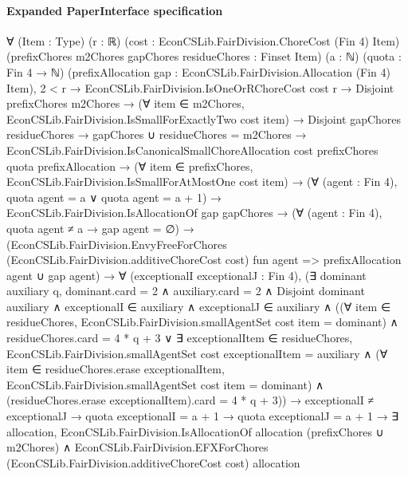 \documentclass[10pt]{article}
\begin{document}
\paragraph{Expanded PaperInterface specification}
\begin{ReviewVerbatim}
∀ (Item : Type) (r : ℝ) (cost : EconCSLib.FairDivision.ChoreCost (Fin 4) Item)
  (prefixChores m2Chores gapChores residueChores : Finset Item) (a : ℕ) (quota : Fin 4 → ℕ)
  (prefixAllocation gap : EconCSLib.FairDivision.Allocation (Fin 4) Item),
  2 < r →
    EconCSLib.FairDivision.IsOneOrRChoreCost cost r →
      Disjoint prefixChores m2Chores →
        (∀ item ∈ m2Chores, EconCSLib.FairDivision.IsSmallForExactlyTwo cost item) →
          Disjoint gapChores residueChores →
            gapChores ∪ residueChores = m2Chores →
              EconCSLib.FairDivision.IsCanonicalSmallChoreAllocation cost prefixChores quota prefixAllocation →
                (∀ item ∈ prefixChores, EconCSLib.FairDivision.IsSmallForAtMostOne cost item) →
                  (∀ (agent : Fin 4), quota agent = a ∨ quota agent = a + 1) →
                    EconCSLib.FairDivision.IsAllocationOf gap gapChores →
                      (∀ (agent : Fin 4), quota agent ≠ a → gap agent = ∅) →
                        (EconCSLib.FairDivision.EnvyFreeForChores (EconCSLib.FairDivision.additiveChoreCost cost)
                            fun agent => prefixAllocation agent ∪ gap agent) →
                          ∀ (exceptionalI exceptionalJ : Fin 4),
                            (∃ dominant auxiliary q,
                                dominant.card = 2 ∧
                                  auxiliary.card = 2 ∧
                                    Disjoint dominant auxiliary ∧
                                      exceptionalI ∈ auxiliary ∧
                                        exceptionalJ ∈ auxiliary ∧
                                          ((∀ item ∈ residueChores,
                                                EconCSLib.FairDivision.smallAgentSet cost item = dominant) ∧
                                              residueChores.card = 4 * q + 3 ∨
                                            ∃ exceptionalItem ∈ residueChores,
                                              EconCSLib.FairDivision.smallAgentSet cost exceptionalItem = auxiliary ∧
                                                (∀ item ∈ residueChores.erase exceptionalItem,
                                                    EconCSLib.FairDivision.smallAgentSet cost item = dominant) ∧
                                                  (residueChores.erase exceptionalItem).card = 4 * q + 3)) →
                              exceptionalI ≠ exceptionalJ →
                                quota exceptionalI = a + 1 →
                                  quota exceptionalJ = a + 1 →
                                    ∃ allocation,
                                      EconCSLib.FairDivision.IsAllocationOf allocation (prefixChores ∪ m2Chores) ∧
                                        EconCSLib.FairDivision.EFXForChores
                                          (EconCSLib.FairDivision.additiveChoreCost cost) allocation
\end{ReviewVerbatim}
\end{document}
